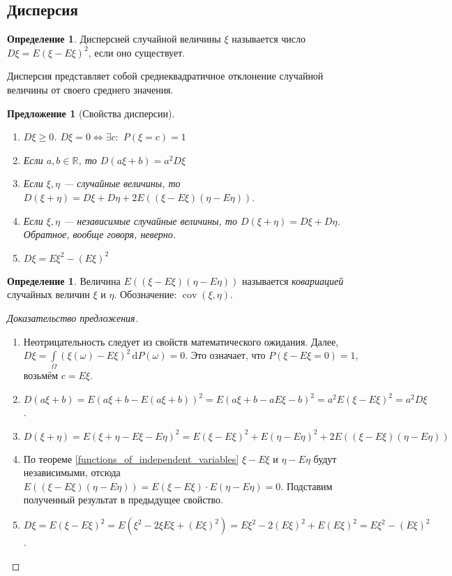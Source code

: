 \documentclass[11pt,openany,a4paper]{scrartcl}
\theoremstyle{plain}
\newtheorem{proposition}[theorem]{Предложение}
\theoremstyle{definition}
\newtheorem{definition}[theorem]{Определение}
\newcommand\mb{\mathbb}
\newcommand\real{\mb R}
\newcommand{\dif}{\, \mathrm d}
\DeclareMathOperator{\cov}{cov}
\begin{document}
\subsection{Дисперсия}

\begin{definition}
    Дисперсией случайной величины $\xi$ называется число
    $D\xi = E(\xi - E\xi)^2$, если оно существует.
\end{definition}

Дисперсия представляет собой среднеквадратичное отклонение случайной величины
от своего среднего значения.

\begin{proposition}[Свойства дисперсии]
    \mbox{}
    \begin{enumerate}
        \item $D\xi \geqslant 0$. $D\xi = 0 \iff  \exists c:$ $P(\xi = c) = 1$
        \item Если $a, b \in \real$, то $D(a\xi + b) = a^2D\xi$
        \item Если $\xi, \eta$ — случайные величины, то $D(\xi + \eta) =
        D\xi + D\eta + 2E((\xi - E\xi)(\eta - E\eta))$.
        \item Если $\xi, \eta$ — независимые случайные величины, то
        $D(\xi+ \eta) = D\xi + D\eta$. Обратное, вообще говоря, неверно.
        \item $D\xi = E\xi^2 - (E\xi)^2$
    \end{enumerate}
\end{proposition}
\begin{definition}
    Величина $E((\xi - E\xi)(\eta - E\eta))$ называется \emph{ковариацией}
    случайных величин $\xi$ и $\eta$. Обозначение: $\cov(\xi, \eta)$.
\end{definition}

\begin{proof}[Доказательство предложения]
\mbox{}
    \begin{enumerate}
        \item Неотрицательность следует из свойств математического ожидания.
        Далее, $D\xi = \int\limits_\Omega(\xi(\omega) - E\xi)^2\dif P(\omega) =
        0$. Это означает, что $P(\xi - E\xi = 0) = 1$, возьмём $c = E\xi$.
        \item $D(a\xi + b) = E(a\xi + b - E(a\xi + b))^2 =
        E(a\xi + b - aE\xi - b)^2 = a^2E(\xi - E\xi)^2 = a^2D\xi$.
        \item $D(\xi + \eta) = E(\xi + \eta - E\xi - E\eta)^2 = E(\xi - E\xi)^2 +
        E(\eta - E\eta)^2 + 2E((\xi - E\xi)(\eta - E\eta))$
        \item По теореме \ref{functions_of_independent_variables} $\xi - E\xi$ и
        $\eta - E\eta$ будут независимыми, отсюда
        $E((\xi - E\xi)(\eta - E\eta)) = E(\xi - E\xi)\cdot E(\eta - E\eta) = 0$.
        Подставим полученный результат в предыдущее свойство.
        \item $D\xi = E(\xi - E\xi)^2 = E(\xi^2 - 2\xi E\xi + (E\xi)^2) =
        E\xi^2 - 2(E\xi)^2 + E(E\xi)^2 = E\xi^2 - (E\xi)^2$.
    \end{enumerate}
\end{proof}
\end{document}
